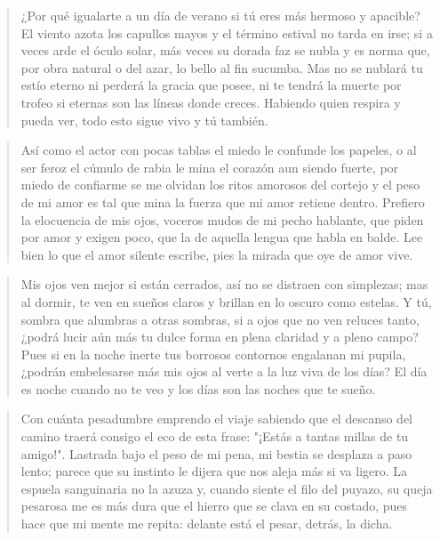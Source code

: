 \documentclass[12pt]{article}
\begin{document}
\clearpage
{}
\begin{verse}
¿Por qué igualarte a un día de verano  
si tú eres más hermoso y apacible?  
El viento azota los capullos mayos  
y el término estival no tarda en irse;  
si a veces arde el óculo solar,  
más veces su dorada faz se nubla  
y es norma que, por obra natural  
o del azar, lo bello al fin sucumba.  
Mas no se nublará tu estío eterno  
ni perderá la gracia que posee,  
ni te tendrá la muerte por trofeo  
si eternas son las líneas donde creces.  
Habiendo quien respira y pueda ver,  
todo esto sigue vivo y tú también.

\end{verse}

\clearpage
{}
\begin{verse}
Así como el actor con pocas tablas  
el miedo le confunde los papeles,  
o al ser feroz el cúmulo de rabia  
le mina el corazón aun siendo fuerte,  
por miedo de confiarme se me olvidan  
los ritos amorosos del cortejo  
y el peso de mi amor es tal que mina  
la fuerza que mi amor retiene dentro.  
Prefiero la elocuencia de mis ojos,  
voceros mudos de mi pecho hablante,  
que piden por amor y exigen poco,  
que la de aquella lengua que habla en balde.  
Lee bien lo que el amor silente escribe,  
pies la mirada que oye de amor vive.

\end{verse}

\clearpage
{}
\begin{verse}
Mis ojos ven mejor si están cerrados,  
así no se distraen con simplezas;  
mas al dormir, te ven en sueños claros  
y brillan en lo oscuro como estelas.  
Y tú, sombra que alumbras a otras sombras,  
si a ojos que no ven reluces tanto,  
¿podrá lucir aún más tu dulce forma  
en plena claridad y a pleno campo?  
Pues si en la noche inerte tus borrosos  
contornos engalanan mi pupila,  
¿podrán embelesarse más mis ojos  
al verte a la luz viva de los días?  
El día es noche cuando no te veo  
y los días son las noches que te sueño.

\end{verse}

\clearpage
{}
\begin{verse}
Con cuánta pesadumbre emprendo el viaje  
sabiendo que el descanso del camino  
traerá consigo el eco de esta frase:  
"¡Estás a tantas millas de tu amigo!".  
Lastrada bajo el peso de mi pena,  
mi bestia se desplaza a paso lento;  
parece que su instinto le dijera  
que nos aleja más si va ligero.  
La espuela sanguinaria no la azuza  
y, cuando siente el filo del puyazo,  
su queja pesarosa me es más dura  
que el hierro que se clava en su costado,  
pues hace que mi mente me repita:  
delante está el pesar, detrás, la dicha.

\end{verse}
\end{document}
